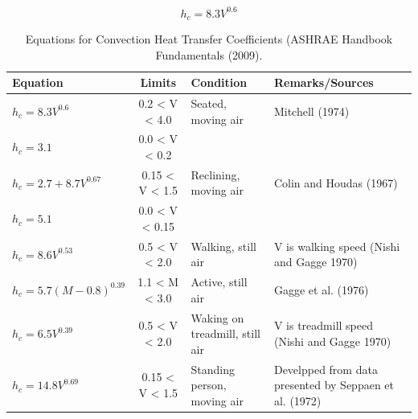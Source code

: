        \begin{equation}
            h_c = 8.3V^{0.6} \label{eq:hc}
        \end{equation}
    \begin{table}[h!]
            \centering
            \begin{tabular}{l|c| p{4.5cm} |p{4cm}}\hline
                 Equation & Limits & Condition & Remarks/Sources \\\hline\hline
                 $h_c = 8.3 V^{0.6}$ & 0.2 < V < 4.0 & Seated, moving air & Mitchell (1974)\\
                 $h_c = 3.1$ & 0.0 < V < 0.2 & &\\
            \hline
                 $h_c = 2.7 + 8.7V^{0.67}$ & 0.15 < V < 1.5 & Reclining, moving air & Colin and Houdas (1967)\\
                 $h_c = 5.1$               & 0.0 < V < 0.15 & & \\\hline
                
                $h_c = 8.6V^{0.53}$ & 0.5 < V < 2.0 & Walking, still air & V is walking speed (Nishi and Gagge 1970)\\\hline
                $h_c = 5.7(M-0.8)^{0.39}$ & 1.1 < M < 3.0 & Active, still air & Gagge et al. (1976)\\\hline
                $h_c = 6.5V^{0.39}$ & 0.5 < V < 2.0 & Waking on treadmill, still air & V is treadmill speed (Nishi and Gagge 1970)\\\hline
                $h_c = 14.8V^{0.69}$ & 0.15 < V < 1.5 & Standing person, moving air & Develpped from data presented by Seppaen et al. (1972)\\
                \hline 
            \end{tabular}
            \caption{Equations for Convection Heat Transfer Coefficients (ASHRAE Handbook Fundamentals (2009).}
            \label{tab:hcs}
    \end{table}
        
